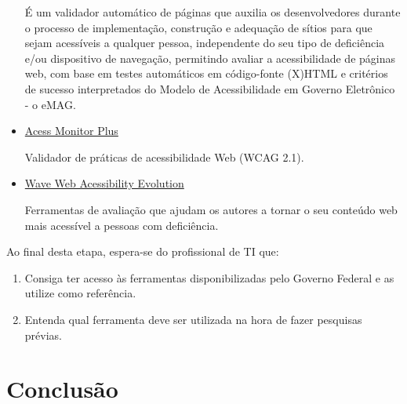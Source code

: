 \documentclass[
  12pt,
  openright,
  twoside,
  a4paper,
  english,
  french,
  spanish,
  brazil
]{abntex2}
\begin{document}
\begin{itemize}
    É um validador automático de páginas que auxilia os desenvolvedores durante
    o processo de implementação, construção e adequação de sítios para que sejam
    acessíveis a qualquer pessoa, independente do seu tipo de deficiência e/ou
    dispositivo de navegação, permitindo avaliar a acessibilidade de páginas
    web, com base em testes automáticos em código-fonte (X)HTML e critérios de
    sucesso interpretados do Modelo de Acessibilidade em Governo Eletrônico - o
    eMAG.

  \item
    \href{https://accessmonitor.acessibilidade.gov.pt}{Acess Monitor Plus}

    Validador de práticas de acessibilidade Web (WCAG 2.1).

  \item
    \href{https://wave.webaim.org/}{Wave Web Acessibility Evolution}

    Ferramentas de avaliação que ajudam os autores a tornar o seu conteúdo web
    mais acessível a pessoas com deficiência.
\end{itemize}

Ao final desta etapa, espera-se do profissional de TI que:

\begin{enumerate}
  \item
    Consiga ter acesso às ferramentas disponibilizadas pelo Governo Federal e as
    utilize como referência.
  \item
    Entenda qual ferramenta deve ser utilizada na hora de fazer pesquisas
    prévias.
\end{enumerate}

\chapter{Conclusão}

\postextual



\printindex
\end{document}

